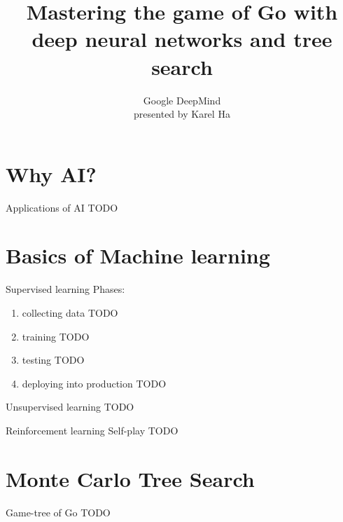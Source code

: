 \documentclass{beamer}
\title{Mastering the game of Go with deep neural networks and tree search}
\date{}                         %
\author{Google DeepMind \\ presented by Karel Ha}
\institute{Spring School of Combinatorics 2016}
\newcommand{\todo}{\alert{TODO}}
\begin{document}
  \maketitle


  \section{Why AI?}

  \begin{frame}{Applications of AI}
    \todo
  \end{frame}


  \section{Basics of Machine learning}
  \begin{frame}{Supervised learning}
    Phases:
    \begin{enumerate}
        \pause
      \item \alert{collecting data} \todo
        \pause
      \item \alert{training} \todo
        \pause
      \item \alert{testing} \todo
        \pause
      \item \alert{deploying into production} \todo
    \end{enumerate}
  \end{frame}

  \begin{frame}{Unsupervised learning}
    \todo
  \end{frame}

  \begin{frame}{Reinforcement learning}
    \alert{Self-play}
    \todo
  \end{frame}


  \section{Monte Carlo Tree Search}
  \begin{frame}{Game-tree of Go}
    \todo
  \end{frame}
\end{document}
